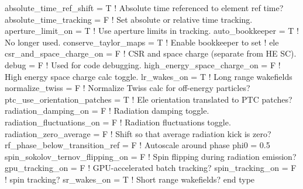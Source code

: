 {\begin{example}
    absolute_time_ref_shift = T         ! Absolute time referenced to element ref time?
    absolute_time_tracking = F          ! Set absolute or relative time tracking.
    aperture_limit_on = T               ! Use aperture limits in tracking.
    auto_bookkeeper = T                 ! No longer used.
    conserve_taylor_maps = T            ! Enable bookkeeper to set
                                        ! ele%
    csr_and_space_charge_on = F         ! CSR and space charge (separate from HE SC).
    debug = F                           ! Used for code debugging.
    high_energy_space_charge_on = F     ! High energy space charge calc toggle.
    lr_wakes_on = T                     ! Long range wakefields
    normalize_twiss = F                 ! Normalize Twiss calc for off-energy particles?
    ptc_use_orientation_patches = T     ! Ele orientation translated to PTC patches?
    radiation_damping_on = F            ! Radiation damping toggle.
    radiation_fluctuations_on = F       ! Radiation fluctuations toggle.
    radiation_zero_average = F          ! Shift so that average radiation kick is zero?
    rf_phase_below_transition_ref = F   ! Autoscale around phase phi0 = 0.5
    spin_sokolov_ternov_flipping_on = F ! Spin flipping during radiation emission?
    gpu_tracking_on = F                 ! GPU-accelerated batch tracking?
    spin_tracking_on = F                ! spin tracking?
    sr_wakes_on = T                     ! Short range wakefields?
  end type
\end{example}

}

